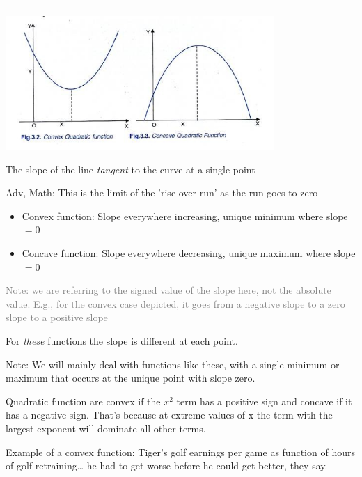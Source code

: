 \documentclass[]{article}
\providecommand{\tightlist}{%
  \setlength{\itemsep}{0pt}\setlength{\parskip}{0pt}}
\begin{document}
\begin{center}\rule{0.5\linewidth}{\linethickness}\end{center}

\includegraphics[height=2in]{picsfigs/concaveconvexquadratics.jpg}

\begin{description}
\tightlist
\item[Instantaneous rate of change (instantaneous slope)]
The slope of the line \emph{tangent} to the curve at a single point
\end{description}

\textcolor{RawSienna}{Adv, Math: This is the limit of the 'rise over run' as the run goes to zero}

\begin{itemize}
\item
  Convex function: Slope everywhere increasing, unique minimum where
  slope \(=0\)
\item
  Concave function: Slope everywhere decreasing, unique maximum where
  slope \(=0\)
\end{itemize}

\textcolor{gray}{Note: we are referring to the signed value of the slope here, not the absolute value. E.g., for the convex case depicted, it goes from a negative slope to a zero slope to a positive slope}

\bigskip

For \emph{these} functions the slope is different at each point.

Note: We will mainly deal with functions like these, with a single
minimum or maximum that occurs at the unique point with slope zero.

Quadratic function are convex if the \(x^2\) term has a positive sign
and concave if it has a negative sign. That's because at extreme values
of x the term with the largest exponent will dominate all other terms.

Example of a convex function: Tiger's golf earnings per game as function
of hours of golf retraining\ldots{} he had to get worse before he could
get better, they say.
\end{document}
